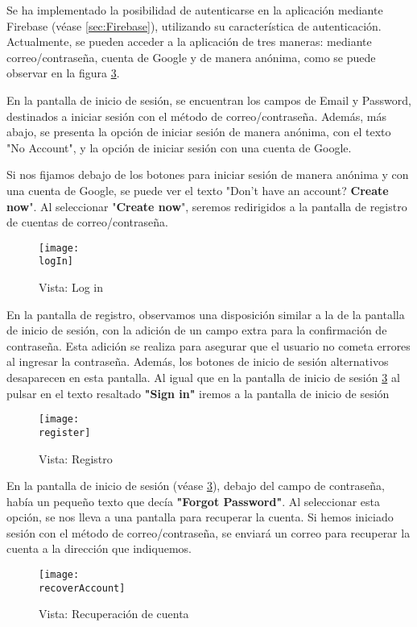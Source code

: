 \documentclass[12pt,twoside,titlepage]{report}
\newcommand{\logIn}{images/login.png}
\newcommand{\register}{images/register.png}
\newcommand{\recoverAccount}{images/recover_account.png}
\begin{document}
Se ha implementado la posibilidad de autenticarse en la aplicación mediante Firebase (véase \ref{sec:Firebase}), utilizando su característica de autenticación. Actualmente, se pueden acceder a la aplicación de tres maneras: mediante correo/contraseña, cuenta de Google y de manera anónima, como se puede observar en la figura \ref{fig:Log-In}.

En la pantalla de inicio de sesión, se encuentran los campos de Email y Password, destinados a iniciar sesión con el método de correo/contraseña. Además, más abajo, se presenta la opción de iniciar sesión de manera anónima, con el texto "No Account", y la opción de iniciar sesión con una cuenta de Google.

Si nos fijamos debajo de los botones para iniciar sesión de manera anónima y con una cuenta de Google, se puede ver el texto "Don't have an account? \textbf{Create now}". Al seleccionar "\textbf{Create now}", seremos redirigidos a la pantalla de registro de cuentas de correo/contraseña.

\begin{figure}[H]
    \centering
	\texttt{[image: \\logIn]}
    \caption{Vista: Log in}
    \label{fig:Log-In}
\end{figure}

En la pantalla de registro, observamos una disposición similar a la de la pantalla de inicio de sesión, con la adición de un campo extra para la confirmación de contraseña. Esta adición se realiza para asegurar que el usuario no cometa errores al ingresar la contraseña. Además, los botones de inicio de sesión alternativos desaparecen en esta pantalla. Al igual que en la pantalla de inicio de sesión \ref{fig:Log-In} al pulsar en el texto resaltado \textbf{"Sign in"} iremos a la pantalla de inicio de sesión

\begin{figure}[H]
    \centering
	\texttt{[image: \\register]}
    \caption{Vista: Registro}
    \label{fig:Log-In}
\end{figure}

En la pantalla de inicio de sesión (véase \ref{fig:Log-In}), debajo del campo de contraseña, había un pequeño texto que decía \textbf{"Forgot Password"}. Al seleccionar esta opción, se nos lleva a una pantalla para recuperar la cuenta. Si hemos iniciado sesión con el método de correo/contraseña, se enviará un correo para recuperar la cuenta a la dirección que indiquemos.

\begin{figure}[H]
    \centering
	\texttt{[image: \\recoverAccount]}
    \caption{Vista: Recuperación de cuenta}
    \label{fig:Log-In}
\end{figure}
\end{document}
